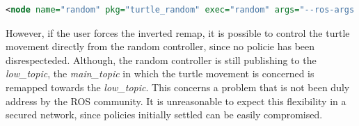 \begin{lstlisting}[title={Attempting the \textit{low\_topic} remap.}, language=xml]
<node name="random" pkg="turtle_random" exec="random" args="--ros-args --enclave /random -r /low_topic:=/main_topic"/>
\end{lstlisting}

However, if the user forces the inverted remap, it is possible to control the turtle movement directly from the random controller, since no policie has been disrespecteded. Although, the random controller is still publishing to the \textit{low\_topic}, the \textit{main\_topic} in which the turtle movement is concerned is remapped towards the \textit{low\_topic}. This concerns a problem that is not been duly address by the ROS community. It is unreasonable to expect this flexibility in a secured network, since policies initially settled can be easily compromised.